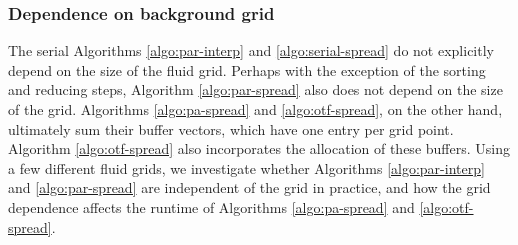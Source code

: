 \subsubsection{Dependence on background grid}

The serial Algorithms \ref{algo:par-interp} and \ref{algo:serial-spread}
do not explicitly depend on the size of the fluid grid. Perhaps with the
exception of the sorting and reducing steps, Algorithm \ref{algo:par-spread}
also does not depend on the size of the grid. Algorithms \ref{algo:pa-spread}
and \ref{algo:otf-spread}, on the other hand, ultimately sum their buffer
vectors, which have one entry per grid point. Algorithm \ref{algo:otf-spread}
also incorporates the allocation of these buffers. Using a few different fluid
grids, we investigate whether Algorithms \ref{algo:par-interp} and
\ref{algo:par-spread} are independent of the grid in practice, and how the grid
dependence affects the runtime of Algorithms \ref{algo:pa-spread} and
\ref{algo:otf-spread}.
%

